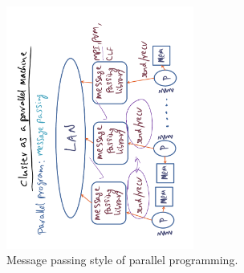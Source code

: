 \documentclass[11pt]{lecture}
\def\fullsize{0.55\textwidth}
\begin{document}
\begin{figure}
\centering
\includegraphics[width=\fullsize,angle=-90]{Figures/message-passing}
\caption{Message passing style of parallel programming.}\label{fig: message-passing}
\end{figure}
\end{document}
